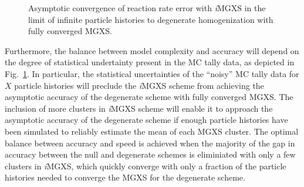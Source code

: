 \begin{figure}[ht!]
\centering
{}
\caption[Asympotic convergence of\textit{i}MGXS to degenerate homogenization]{Asymptotic convergence of reaction rate error with \textit{i}\ac{MGXS} in the limit of infinite particle histories to degenerate homogenization with fully converged \ac{MGXS}.}
\label{fig:chap11-coverge-complexity}
\end{figure}

Furthermore, the balance between model complexity and accuracy will depend on the degree of statistical undertainty present in the \ac{MC} tally data, as depicted in Fig.~\ref{fig:chap11-coverge-complexity}. In particular, the statistical uncertainties of the ``noisy'' \ac{MC} tally data for $X$ particle histories will preclude the \textit{i}\ac{MGXS} scheme from achieving the asymptotic accuracy of the degenerate scheme with fully converged \ac{MGXS}. The inclusion of more clusters in \textit{i}\ac{MGXS} scheme will enable it to approach the asymptotic accuracy of the degenerate scheme if enough particle histories have been simulated to reliably estimate the mean of each \ac{MGXS} cluster. The optimal balance between accuracy and speed is achieved when the majority of the gap in accuracy between the null and degenerate schemes is eliminiated with only a few clusters in \textit{i}\ac{MGXS}, which quickly converge with only a fraction of the particle histories needed to converge the \ac{MGXS} for the degenerate scheme.

